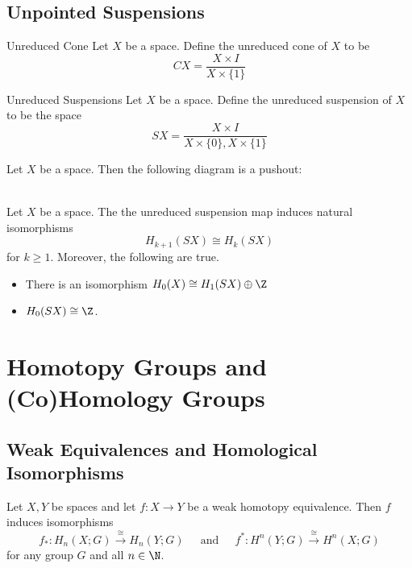 \documentclass[a4paper]{article}
\begin{document}
\subsection{Unpointed Suspensions}
\begin{defn}{Unreduced Cone}{} Let $X$ be a space. Define the unreduced cone of $X$ to be $$CX=\frac{X\times I}{X\times\{1\}}$$
\end{defn}

\begin{defn}{Unreduced Suspensions}{} Let $X$ be a space. Define the unreduced suspension of $X$ to be the space $$SX=\frac{X\times I}{X\times\{0\},X\times\{1\}}$$
\end{defn}

\begin{prp}{}{} Let $X$ be a space. Then the following diagram is a pushout: \\
\\
\end{prp}

\begin{prp}{}{} Let $X$ be a space. The the unreduced suspension map induces natural isomorphisms $$H_{k+1}(SX)\cong H_k(SX)$$ for $k\geq 1$. Moreover, the following are true. 
\begin{itemize}
\item There is an isomorphism $H_0(X)\cong H_1(SX)\oplus\Z$
\item $H_0(SX)\cong\Z$. 
\end{itemize}
\end{prp}

\pagebreak
\section{Homotopy Groups and (Co)Homology Groups}
\subsection{Weak Equivalences and Homological Isomorphisms}
\begin{prp}{}{} Let $X,Y$ be spaces and let $f:X\to Y$ be a weak homotopy equivalence. Then $f$ induces isomorphisms $$f_\ast:H_n(X;G)\overset{\cong}{\longrightarrow}H_n(Y;G)\;\;\;\;\text{ and }\;\;\;\;f^\ast:H^n(Y;G)\overset{\cong}{\longrightarrow}H^n(X;G)$$ for any group $G$ and all $n\in\N$. 
\end{prp}
\end{document}
